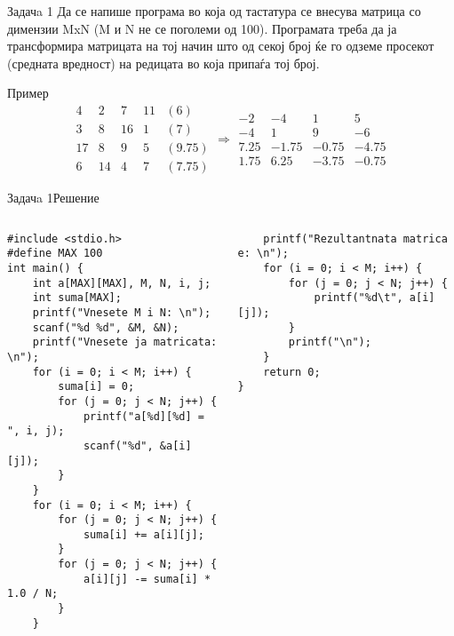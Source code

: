 \begin{frame}[fragile]{Задачa 1}
Да се напише програма во која од тастатура се внесува матрица со димензии MxN (M
и N не се поголеми од 100). Програмата треба да ја трансформира матрицата на тој
начин што од секој број ќе го одземе просекот (средната вредност) на
редицата во која припаѓа тој број.
\begin{exampleblock}{Пример}
\[
 \begin{matrix}
  4 & 2 & 7 & 11 & (6) \\
  3 & 8 & 16 & 1 & (7) \\
  17 & 8 & 9 & 5 & (9.75) \\
  6 & 14 & 4 & 7 & (7.75)
 \end{matrix}
 \Longrightarrow
 \begin{matrix}
 -2 & -4 & 1 & 5\\
 -4 & 1 & 9 & -6\\
 7.25 & -1.75 & -0.75 & -4.75\\
 1.75 & 6.25 & -3.75 & -0.75
 \end{matrix}
\]
\end{exampleblock}
\end{frame}

\begin{frame}[fragile]{Задачa 1}{Решение}
\begin{columns}
    \begin{lstlisting}
#include <stdio.h>
#define MAX 100
int main() {
    int a[MAX][MAX], M, N, i, j;
    int suma[MAX];
    printf("Vnesete M i N: \n");
    scanf("%d %d", &M, &N);
    printf("Vnesete ja matricata: \n");
    for (i = 0; i < M; i++) {
        suma[i] = 0;
        for (j = 0; j < N; j++) {
            printf("a[%d][%d] = ", i, j);
            scanf("%d", &a[i][j]);
        }
    }
    for (i = 0; i < M; i++) {
        for (j = 0; j < N; j++) {
            suma[i] += a[i][j];
        }
        for (j = 0; j < N; j++) {
            a[i][j] -= suma[i] * 1.0 / N;
        }
    }
\end{lstlisting}    
\begin{lstlisting}
    printf("Rezultantnata matrica e: \n");
    for (i = 0; i < M; i++) {
        for (j = 0; j < N; j++) {
            printf("%d\t", a[i][j]);
        }
        printf("\n");
    }
    return 0;
}
\end{lstlisting}
\end{columns}
\end{frame}

